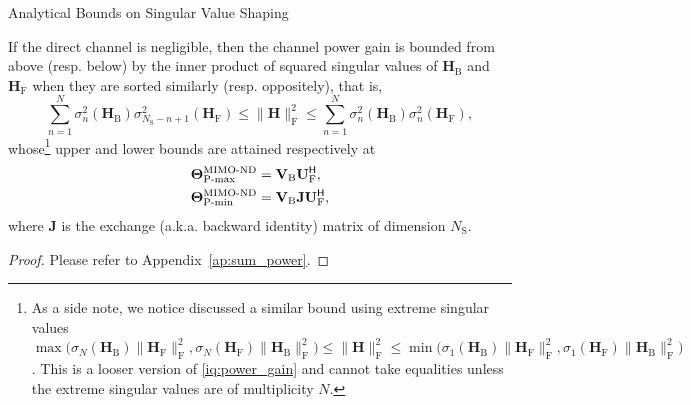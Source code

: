 \begin{section}{Analytical Bounds on Singular Value Shaping}
	\begin{corollary}
		If the direct channel is negligible, then the channel power gain is bounded from above (resp. below) by the inner product of squared singular values of $\mathbf{H}_\mathrm{B}$ and $\mathbf{H}_\mathrm{F}$ when they are sorted similarly (resp. oppositely), that is,
		\begin{equation}
			\sum_{n=1}^N \sigma_n^2(\mathbf{H}_\mathrm{B}) \sigma_{N_\mathrm{S}-n+1}^2(\mathbf{H}_\mathrm{F}) \le \lVert \mathbf{H} \rVert _\mathrm{F}^2 \le \sum_{n=1}^N \sigma_n^2(\mathbf{H}_\mathrm{B}) \sigma_n^2(\mathbf{H}_\mathrm{F}),
			\label{iq:power_gain}
		\end{equation}
		whose\footnote{As a side note, we notice \cite{Fang1994} discussed a similar bound using extreme singular values $\max\bigl(\sigma_{N}(\mathbf{H}_\mathrm{B}) \lVert \mathbf{H}_\mathrm{F} \rVert _\mathrm{F}^2, \sigma_{N}(\mathbf{H}_\mathrm{F}) \lVert \mathbf{H}_\mathrm{B} \rVert _\mathrm{F}^2\bigr) \le \lVert \mathbf{H} \rVert _\mathrm{F}^2 \le \min\bigl(\sigma_1(\mathbf{H}_\mathrm{B}) \lVert \mathbf{H}_\mathrm{F} \rVert _\mathrm{F}^2, \sigma_1(\mathbf{H}_\mathrm{F}) \lVert \mathbf{H}_\mathrm{B} \rVert _\mathrm{F}^2\bigr)$. This is a looser version of \eqref{iq:power_gain} and cannot take equalities unless the extreme singular values are of multiplicity $N$.} upper and lower bounds are attained respectively at
		\begin{subequations}
			\begin{align}
				\mathbf{\Theta}_\textnormal{P-max}^\textnormal{MIMO-ND} & = \mathbf{V}_\mathrm{B} \mathbf{U}_\mathrm{F}^\mathsf{H}, \label{eq:power_max}            \\
				\mathbf{\Theta}_\textnormal{P-min}^\textnormal{MIMO-ND} & = \mathbf{V}_\mathrm{B} \mathbf{J} \mathbf{U}_\mathrm{F}^\mathsf{H} \label{eq:power_min},
			\end{align}
		\end{subequations}
		where $\mathbf{J}$ is the exchange (a.k.a. backward identity) matrix of dimension $N_\mathrm{S}$.
	\end{corollary}
	\begin{proof}
		Please refer to Appendix~\ref{ap:sum_power}.
	\end{proof}


\end{section}
